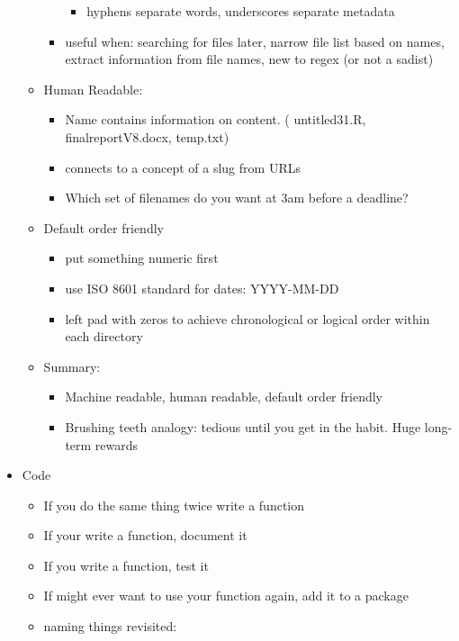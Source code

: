 \documentclass[
  12pt,
]{book}
\providecommand{\tightlist}{%
  \setlength{\itemsep}{0pt}\setlength{\parskip}{0pt}}
\theoremstyle{definition}
\theoremstyle{definition}
\theoremstyle{definition}
\theoremstyle{definition}
\theoremstyle{remark}
\begin{document}
\begin{itemize}
\begin{itemize}
\begin{itemize}
      \begin{itemize}
      \tightlist
      \item
        hyphens separate words, underscores separate metadata
      \end{itemize}
    \item
      useful when: searching for files later, narrow file list based on names, extract information from file names, new to regex (or not a sadist)
    \end{itemize}
  \item
    Human Readable:

    \begin{itemize}
    \tightlist
    \item
      Name contains information on content. ( untitled31.R, finalreportV8.docx, temp.txt)
    \item
      connects to a concept of a slug from URLs
    \item
      Which set of filenames do you want at 3am before a deadline?
    \end{itemize}
  \item
    Default order friendly

    \begin{itemize}
    \tightlist
    \item
      put something numeric first
    \item
      use ISO 8601 standard for dates: YYYY-MM-DD
    \item
      left pad with zeros to achieve chronological or logical order within each directory
    \end{itemize}
  \item
    Summary:

    \begin{itemize}
    \tightlist
    \item
      Machine readable, human readable, default order friendly
    \item
      Brushing teeth analogy: tedious until you get in the habit. Huge long-term rewards
    \end{itemize}
  \end{itemize}
\item
  Code

  \begin{itemize}
  \tightlist
  \item
    If you do the same thing twice write a function
  \item
    If your write a function, document it
  \item
    If you write a function, test it
  \item
    If might ever want to use your function again, add it to a package
  \item
    naming things revisited:


\end{itemize}
\end{itemize}
\end{document}
